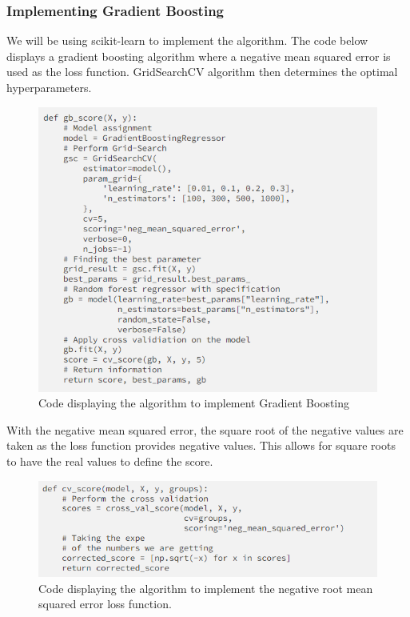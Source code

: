 \documentclass[12pt]{article}
\begin{document}
\subsubsection{Implementing Gradient Boosting}
We will be using scikit-learn to implement the algorithm.
The code below displays a gradient boosting algorithm where a negative mean squared error is used as the loss function.
GridSearchCV algorithm then determines the optimal hyperparameters.
 \begin{figure}[H]
    \centering
    \includegraphics[width=15cm]{GBoost1.png}
    \caption{Code displaying the algorithm to implement Gradient Boosting}
    \label{fig:k-means-code2}
\end{figure}
With the negative mean squared error, the square root of the negative values are taken as the loss function provides negative values. This allows for square roots to have the real values to define the score.
 \begin{figure}[H]
    \centering
    \includegraphics[width=15cm]{GBoost2.png}
    \caption{Code displaying the algorithm to implement the negative root mean squared error loss function.}
    \label{fig:k-means-code2}
\end{figure}
\end{document}
